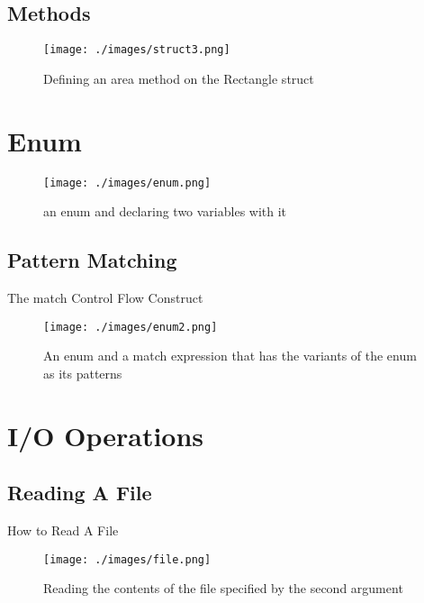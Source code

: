 \documentclass[10pt]{beamer}
\begin{document}
\subsection{Methods}
\begin{frame}
    \begin{figure}[htpb]
        \centering
        \texttt{[image: ./images/struct3.png]}
        \caption{Defining an area method on the Rectangle struct\cite{rust-book}}
    \end{figure}
\end{frame}

\section{Enum}
\begin{frame}
    \begin{figure}[htpb]
        \centering
        \texttt{[image: ./images/enum.png]}
        \caption{an enum and declaring two variables with it\cite{rust-book}}
    \end{figure}
\end{frame}

\subsection{Pattern Matching}
\begin{frame}{The match Control Flow Construct}
    \begin{figure}[htpb]
        \centering
        \texttt{[image: ./images/enum2.png]}
        \caption{An enum and a match expression that has the variants of the enum as its patterns\cite{rust-book}}
    \end{figure}
\end{frame}

\section{I/O Operations}
\subsection{Reading A File}
\begin{frame}{How to Read A File}
    \begin{figure}[htpb]
        \centering
        \texttt{[image: ./images/file.png]}
        \caption{Reading the contents of the file specified by the second argument\cite{rust-book}}
    \end{figure}
\end{frame}
\end{document}
